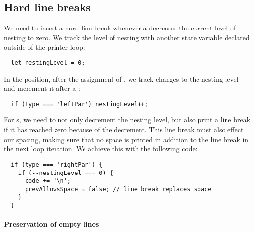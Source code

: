 \subsection{Hard line breaks}
We need to insert a hard line break
whenever a  decreases the
current level of nesting to zero.
We track the level of nesting with another
state variable declared outside of the printer loop:
\begin{verbatim}
  let nestingLevel = 0;
\end{verbatim}

In the  position,
after the assignment of ,
we track changes to the nesting level and
increment it after a :
\begin{verbatim}
  if (type === 'leftPar') nestingLevel++;
\end{verbatim}

For s, we need to
not only decrement the nesting level,
but also print a line break if
it has reached zero because of the decrement.
This line break must also effect our spacing,
making sure that no space is printed
in addition to the line break
in the next loop iteration.
We achieve this with the following code:
\begin{verbatim}
  if (type === 'rightPar') {
    if (--nestingLevel === 0) {
      code += '\n';
      prevAllowsSpace = false; // line break replaces space
    }
  }
\end{verbatim}

\paragraph{Preservation of empty lines}

